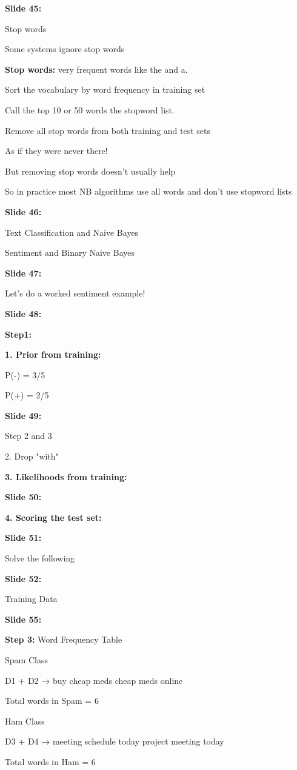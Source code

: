 \documentclass[11pt,a4paper]{article}
\begin{document}
\textbf{Slide 45:}

Stop words

Some systems ignore stop words

\textbf{Stop words:}  very frequent words like the and a.

Sort the vocabulary by word frequency in training set

Call the top 10 or 50 words the stopword list.

Remove all stop words from both training and test sets

As if they were never there!

But removing stop words doesn't usually help

So in practice most NB algorithms use all words and don't use stopword lists

\textbf{Slide 46:}

Text Classification and Naive Bayes

Sentiment and Binary Naive Bayes

\textbf{Slide 47:}

Let's do a worked sentiment example!

\textbf{Slide 48:}

\textbf{Step1:} 

\textbf{1. Prior from training:} 

P(-) = 3/5

P(+) = 2/5

\textbf{Slide 49:}

Step 2 and 3

2. Drop "with"

\textbf{3. Likelihoods from training:} 

\textbf{Slide 50:}

\textbf{4. Scoring the test set:} 

\textbf{Slide 51:}

Solve the following

\textbf{Slide 52:}

Training Data

\textbf{Slide 55:}

\textbf{Step 3:}  Word Frequency Table

Spam Class

D1 + D2 → buy cheap meds cheap meds online

Total words in Spam = 6

Ham Class

D3 + D4 → meeting schedule today project meeting today

Total words in Ham = 6
\end{document}
